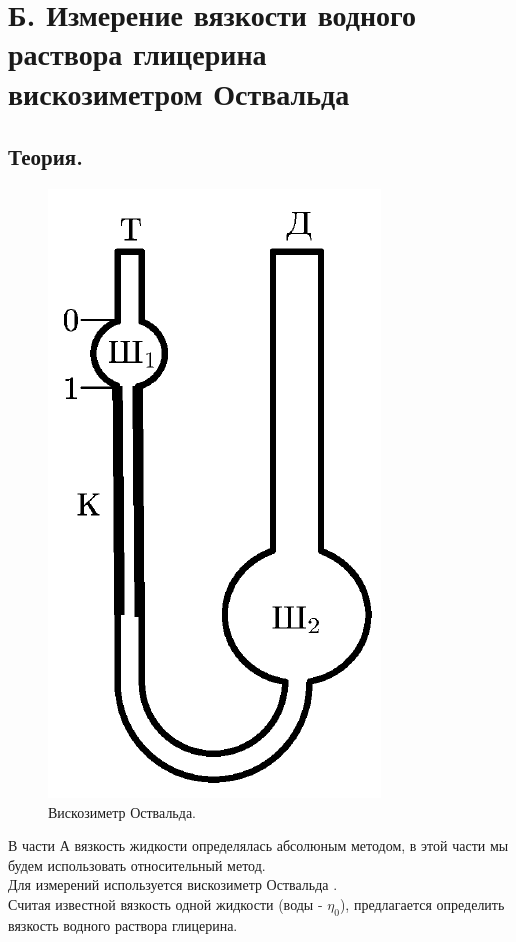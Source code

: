 \documentclass[a4paper, 12pt]{article}
\begin{document}
\section{Б. Измерение вязкости водного раствора глицерина\\ вискозиметром
  Оствальда}
\subsection{Теория.}

\begin{figure}[H]
  \centering
  \includegraphics[scale=0.7]{data/b.png}
  \caption{Вискозиметр Оствальда.}
  \label{fig:Ostwald_viscometer}
\end{figure}

В части А вязкость жидкости определялась абсолюным методом, в этой части мы
будем использовать относительный метод. \\ Для измерений используется вискозиметр
Оствальда . \\ Считая известной вязкость одной
жидкости (воды - $\eta_{0}$), предлагается определить вязкость водного
раствора глицерина. \\
\end{document}
